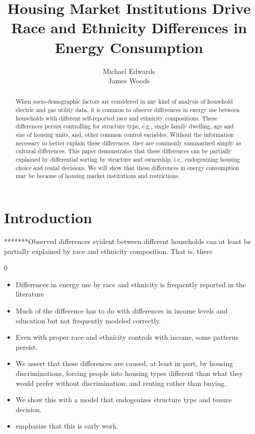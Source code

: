\documentclass{article}
\author{Michael Edwards\\ 
  James Woods}
\title{Housing Market Institutions Drive Race and Ethnicity Differences in Energy Consumption}
\begin{document}
\maketitle


\begin{abstract}

When socio-demographic factors are considered in any kind of analysis of household electric and gas utility data, it is common to observe differences in energy use between households with different self-reported race and ethnicity compositions. These differences persist controlling for structure type, e.g., single family dwelling, age and size of housing units, and, other common control variables. Without the information necessary to better explain these differences, they are commonly summarized simply as cultural differences. This paper demonstrates that these differences can be partially explained by differential sorting by structure and ownership, i.e., endogenizing housing choice and rental decisions. We will show that these differences in energy consumption may be because of housing market institutions and restrictions.
\end{abstract}

\section{Introduction}

*******Observed differences evident between different households can at least be partially explained by race and ethnicity composition.  That is, there 

0
\begin{itemize}

  \item Differences in energy use by race and ethnicity is frequently reported in the literature
  \item Much of the difference has to do with differences in income levels and education but not frequently modeled correctly.
  \item Even with proper race and ethnicity controls with income, some patterns persist.
  \item We assert that these differences are caused, at least in part, by housing discriminations, forcing people into housing types different than what they would prefer without discrimination; and renting rather than buying.
  \item We show this with a model that endogenizes structure type and tenure decision.
  \item emphasize that this is early work.
\end{itemize}
\end{document}
